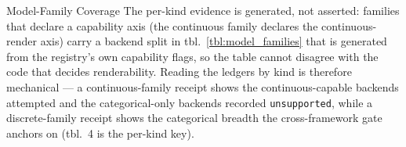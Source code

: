 \documentclass[
  ignorenonframetext,
]{beamer}
\begin{document}
\begin{frame}{Model-Family Coverage}
The per-kind evidence is generated, not asserted: families that declare
a capability axis (the continuous family declares the continuous-render
axis) carry a backend split in tbl.~\ref{tbl:model_families} that is
generated from the registry's own capability flags, so the table cannot
disagree with the code that decides renderability. Reading the ledgers
by kind is therefore mechanical --- a continuous-family receipt shows
the continuous-capable backends attempted and the categorical-only
backends recorded \texttt{unsupported}, while a discrete-family receipt
shows the categorical breadth the cross-framework gate anchors on
(tbl.~4 is the per-kind key).

\end{frame}
\end{document}

